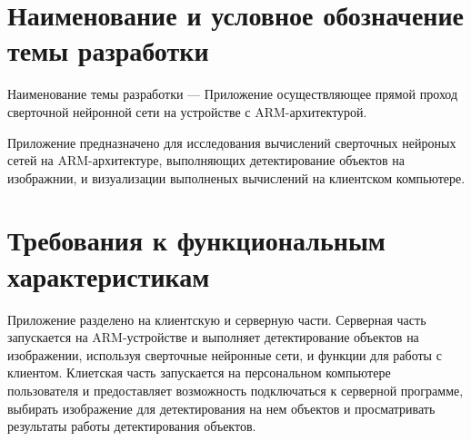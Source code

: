 \documentclass[a4paper,english]{G2-105}
\begin{document}
\section{Наименование и условное обозначение темы разработки}
\par Наименование темы разработки --- Приложение осуществляющее прямой проход сверточной нейронной сети на устройстве с ARM-архитектурой.

\par Приложение предназначено для исследования вычислений сверточных нейроных сетей на ARM-архитектуре, выполняющих детектирование объектов на изображнии, и визуализации выполненых вычислений на клиентском компьютере.

\section{Требования к функциональным характеристикам}
\par Приложение разделено на клиентскую и серверную части. Серверная часть запускается на ARM-устройстве и выполняет детектирование объектов на изображении, используя сверточные нейронные сети, и функции для работы с клиентом. Клиетская часть запускается на персональном компьютере пользователя и предоставляет возможность подключаться к серверной программе, выбирать изображение для детектирования на нем объектов и просматривать результаты работы детектирования объектов. 
\end{document}
